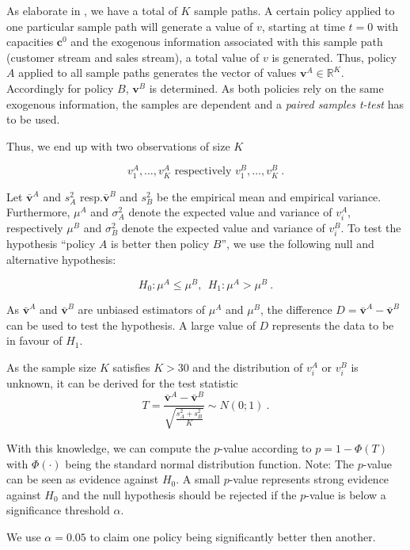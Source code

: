 As elaborate in , we have a total of $K$ sample paths. A certain policy applied to one particular sample path will generate a value of $v$, \ie starting at time $t=0$ with capacities $\boldsymbol{c}^0$ and the exogenous information associated with this sample path (customer stream and sales stream), a total value of $v$ is generated. Thus, policy $A$ applied to all sample paths generates the vector of values $\boldsymbol{v}^A \in \mathbb{R}^K$. Accordingly for policy $B$, $\boldsymbol{v}^B$ is determined. As both policies rely on the same exogenous information, the samples are dependent and a \emph{paired samples t-test} has to be used.

Thus, we end up with two observations of size $K$ 

$$v^A_1, \dots, v^A_K \text{  respectively  } v^B_1, \dots, v^B_K~.$$

Let $\bar{\boldsymbol{v}}^A$ and $s_A^2$ resp.\xspace $\bar{\boldsymbol{v}}^B$ and $s_B^2$ be the empirical mean and empirical variance. Furthermore, $\mu^A$ and $\sigma_A^2$ denote the expected value and variance of $v^A_i$, respectively $\mu^B$ and $\sigma_B^2$ denote the expected value and variance of $v^B_i$. To test the hypothesis \enquote{policy $A$ is better then policy $B$}, we use the following null and alternative hypothesis:

$$H_0: \mu^A \leq \mu^B,~~ H_1: \mu^A > \mu^B~.$$

As $\bar{\boldsymbol{v}}^A$ and $\bar{\boldsymbol{v}}^B$ are unbiased estimators of $\mu^A$ and $\mu^B$, the difference $D = \bar{\boldsymbol{v}}^A - \bar{\boldsymbol{v}}^B$ can be used to test the hypothesis. A large value of $D$ represents the data to be in favour of $H_1$. 

As the sample size $K$ satisfies $K > 30$ and the distribution of $v^A_i$ or $v^B_i$ is unknown, it can be derived for the test statistic
$$T = \frac{\bar{\boldsymbol{v}}^A - \bar{\boldsymbol{v}}^B}{\sqrt{\frac{s_A^2 + s_B^2}{K}}} \sim N(0; 1)~.$$

With this knowledge, we can compute the $p$-value according to $p = 1 - \Phi(T)$ with $\Phi(\cdot)$ being the standard normal distribution function. Note: The $p$-value can be seen as evidence against $H_0$. A small $p$-value represents strong evidence against $H_0$ and the null hypothesis should be rejected if the $p$-value is below a significance threshold $\alpha$.

We use $\alpha = 0.05$ to claim one policy being significantly better then another.

